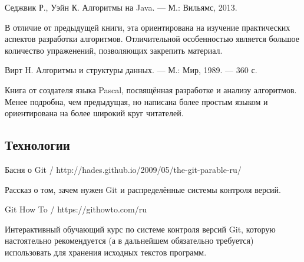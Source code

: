 \begin{thebibliography}{99}
  Седжвик Р., Уэйн К. Алгоритмы на Java. — М.: Вильямс, 2013.

  В отличие от предыдущей книги, эта ориентирована на изучение
  практических аспектов разработки алгоритмов. Отличительной
  особенностью является большое количество упраженений, позволяющих
  закрепить материал.
  
  Вирт Н. Алгоритмы и структуры данных. — М.: Мир, 1989. — 360 с.

  Книга от создателя языка Pascal, посвящённая разработке и анализу
  алгоритмов. Менее подробна, чем предыдущая, но написана более
  простым языком и ориентирована на более широкий круг читателей.

\subsection*{Технологии}

  Басня о Git / http://hades.github.io/2009/05/the-git-parable-ru/
  
  Рассказ о том, зачем нужен Git и распределённые системы контроля версий.

  Git How To / https://githowto.com/ru

  Интерактивный обучающий курс по системе контроля версий Git, которую
  настоятельно рекомендуется (а в дальнейшем обязательно требуется)
  использовать для хранения исходных текстов программ.
\end{thebibliography}
\endgroup
